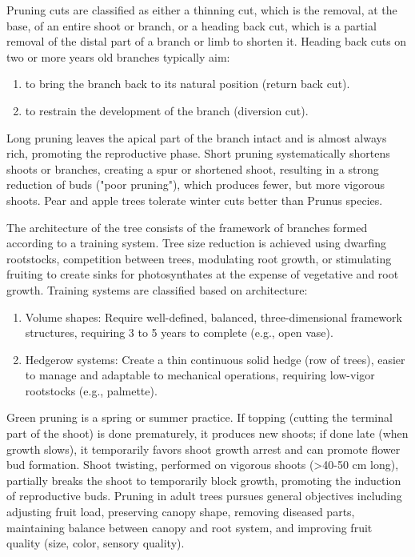 \vspace{0.5em}
Pruning cuts are classified as either a thinning cut, which is the removal, at the base, of an entire shoot or branch, or a heading back cut, which is a partial removal of the distal part of a branch or limb to shorten it. Heading back cuts on two or more years old branches typically aim: 

\begin{enumerate} 
    \item to bring the branch back to its natural position (return back cut). 
    \item to restrain the development of the branch (diversion cut). 
\end{enumerate} 

\vspace{0.5em}
Long pruning leaves the apical part of the branch intact and is almost always rich, promoting the reproductive phase. Short pruning systematically shortens shoots or branches, creating a spur or shortened shoot, resulting in a strong reduction of buds ("poor pruning"), which produces fewer, but more vigorous shoots. Pear and apple trees tolerate winter cuts better than Prunus species.

\vspace{0.5em}
The architecture of the tree consists of the framework of branches formed according to a training system. Tree size reduction is achieved using dwarfing rootstocks, competition between trees, modulating root growth, or stimulating fruiting to create sinks for photosynthates at the expense of vegetative and root growth. Training systems are classified based on architecture: 

\begin{enumerate} 
    \item Volume shapes: Require well-defined, balanced, three-dimensional framework structures, requiring 3 to 5 years to complete (e.g., open vase). 
    \item Hedgerow systems: Create a thin continuous solid hedge (row of trees), easier to manage and adaptable to mechanical operations, requiring low-vigor rootstocks (e.g., palmette). 
\end{enumerate}

\vspace{0.5em}
Green pruning is a spring or summer practice. If topping (cutting the terminal part of the shoot) is done prematurely, it produces new shoots; if done late (when growth slows), it temporarily favors shoot growth arrest and can promote flower bud formation. Shoot twisting, performed on vigorous shoots (>40-50 cm long), partially breaks the shoot to temporarily block growth, promoting the induction of reproductive buds. Pruning in adult trees pursues general objectives including adjusting fruit load, preserving canopy shape, removing diseased parts, maintaining balance between canopy and root system, and improving fruit quality (size, color, sensory quality).

